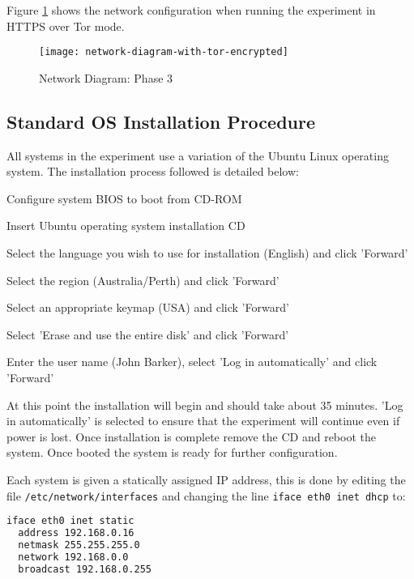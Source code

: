 Figure \ref{network-diagram-with-tor-encrypted} shows the network configuration when
running the experiment in HTTPS over Tor mode.

\begin{figure}[H]
  \centering\texttt{[image: network-diagram-with-tor-encrypted]}
  \caption{Network Diagram: Phase 3}
  \label{network-diagram-with-tor-encrypted}
\end{figure}

\subsection{Standard OS Installation Procedure}
\label{section:os_install}

All systems in the experiment use a variation of the Ubuntu Linux operating
system. The installation process followed is detailed below:

\begin{enumerate*}
  \item Configure system BIOS to boot from CD-ROM
  \item Insert Ubuntu operating system installation CD
  \item Select the language you wish to use for installation (English) and click
    'Forward'
  \item Select the region (Australia/Perth) and click 'Forward'
  \item Select an appropriate keymap (USA) and click 'Forward'
  \item Select 'Erase and use the entire disk' and click 'Forward'
  \item Enter the user name (John Barker), select 'Log in automatically' and click 'Forward'
\end{enumerate*}

At this point the installation will begin and should take about 35 minutes.
'Log in automatically' is selected to ensure that the experiment will continue
even if power is lost. Once installation is complete remove the CD and reboot
the system. Once booted the system is ready for further configuration.

Each system is given a statically assigned IP address, this is done by editing
the file \verb+/etc/network/interfaces+ and changing the line
\verb+iface eth0 inet dhcp+ to:

\begin{lstlisting}[language=sh]
iface eth0 inet static
  address 192.168.0.16
  netmask 255.255.255.0
  network 192.168.0.0
  broadcast 192.168.0.255
\end{lstlisting}

